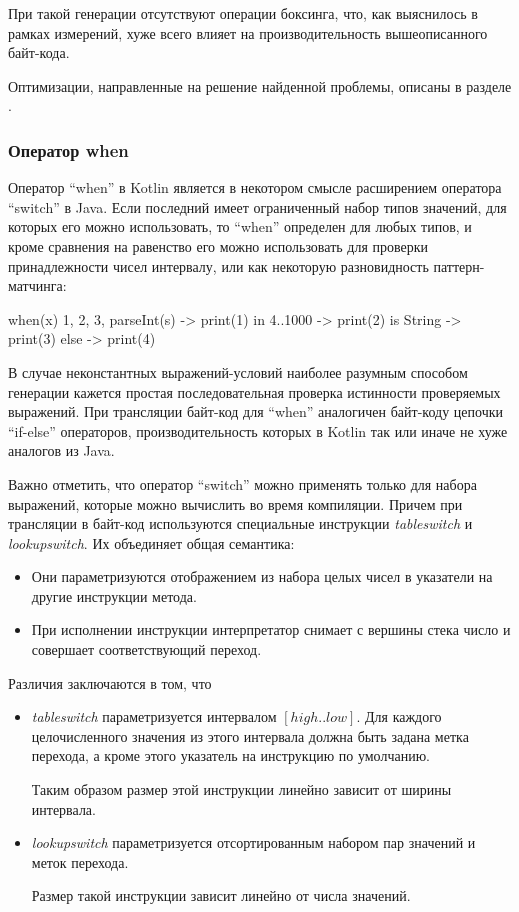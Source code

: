 При такой генерации отсутствуют операции боксинга, что, как выяснилось в рамках измерений,
хуже всего влияет на производительность вышеописанного байт-кода.

Оптимизации, направленные на решение найденной проблемы, описаны в разделе . %

\subsubsection{Оператор when}
Оператор ``when'' в Kotlin является в некотором смысле расширением оператора ``switch'' в Java.
Если последний имеет ограниченный набор типов значений, для которых его можно использовать, то
``when'' определен для любых типов, и кроме сравнения на равенство его можно использовать для
проверки принадлежности чисел интервалу, или как некоторую разновидность паттерн-матчинга:

\begin{pyglist}[language=kotlin]
    when(x) {
        1, 2, 3, parseInt(s) -> print(1)
        in 4..1000 -> print(2)
        is String -> print(3)
        else -> print(4)
    }
\end{pyglist}
В случае неконстантных выражений-условий наиболее разумным способом генерации кажется простая
последовательная проверка истинности проверяемых выражений.
При трансляции байт-код для ``when'' аналогичен байт-коду цепочки ``if-else'' операторов,
производительность которых в Kotlin так или иначе не хуже аналогов из Java.

Важно отметить, что оператор ``switch'' можно применять только для набора выражений, которые можно
вычислить во время компиляции.
Причем при трансляции в байт-код используются специальные инструкции \textit{tableswitch} и
\textit{lookupswitch}\cite{JVMSpec}.
Их объединяет общая семантика:
\begin{itemize}
    \item Они параметризуются отображением из набора целых чисел в указатели на другие инструкции
    метода.
    \item При исполнении инструкции интерпретатор снимает с вершины стека число и совершает
    соответствующий переход.
\end{itemize}

Различия заключаются в том, что
\begin{itemize}
    \item \textit{tableswitch} параметризуется интервалом $[high..low]$.
    Для каждого целочисленного значения из этого интервала должна быть задана метка перехода,
    а кроме этого указатель на инструкцию по умолчанию.

    Таким образом размер этой инструкции линейно зависит от ширины интервала.
    \item \textit{lookupswitch} параметризуется отсортированным набором пар значений и меток
    перехода.

    Размер такой инструкции зависит линейно от числа значений.
\end{itemize}

